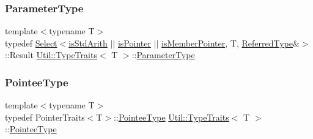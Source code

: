 \mbox{\label{classUtil_1_1TypeTraits_a36b64fb2fc53ff32a8465e8862632db6}} 
\subsubsection{\texorpdfstring{ParameterType}{ParameterType}\hspace{0.1cm}{\footnotesize\ttfamily [3/3]}}
{\footnotesize\ttfamily template$<$typename T$>$ \\
typedef \mbox{\hyperlink{structUtil_1_1Select}{Select}}$<$\mbox{\hyperlink{classUtil_1_1TypeTraits_a1cfd1423cce5a0b762ee8f5c9c2f004ea3017f19abc6084d7e144891aaf5adb0f}{is\+Std\+Arith}} $\vert$$\vert$ \mbox{\hyperlink{classUtil_1_1TypeTraits_ad90505183742eb4b62bc41bd4121fc19a0813f58ed7af0a00a07d0ba641cc3bba}{is\+Pointer}} $\vert$$\vert$ \mbox{\hyperlink{classUtil_1_1TypeTraits_ad2b47cd121495f38449b1f8c10afb067abe04caa758890fee25930d96123265d2}{is\+Member\+Pointer}}, T, \mbox{\hyperlink{classUtil_1_1TypeTraits_a89aec1a9db97b7f70e59b6738c5df4f9}{Referred\+Type}}\&$>$\+::Result \mbox{\hyperlink{classUtil_1_1TypeTraits}{Util\+::\+Type\+Traits}}$<$ T $>$\+::\mbox{\hyperlink{classUtil_1_1TypeTraits_a36b64fb2fc53ff32a8465e8862632db6}{Parameter\+Type}}}

\mbox{\label{classUtil_1_1TypeTraits_aa964d0cd9ee331e0d2d814a33bb93614}} 
\subsubsection{\texorpdfstring{PointeeType}{PointeeType}\hspace{0.1cm}{\footnotesize\ttfamily [1/3]}}
{\footnotesize\ttfamily template$<$typename T$>$ \\
typedef Pointer\+Traits$<$T$>$\+::\mbox{\hyperlink{classUtil_1_1TypeTraits_aa964d0cd9ee331e0d2d814a33bb93614}{Pointee\+Type}} \mbox{\hyperlink{classUtil_1_1TypeTraits}{Util\+::\+Type\+Traits}}$<$ T $>$\+::\mbox{\hyperlink{classUtil_1_1TypeTraits_aa964d0cd9ee331e0d2d814a33bb93614}{Pointee\+Type}}}

\mbox{\label{classUtil_1_1TypeTraits_aa964d0cd9ee331e0d2d814a33bb93614}} 
